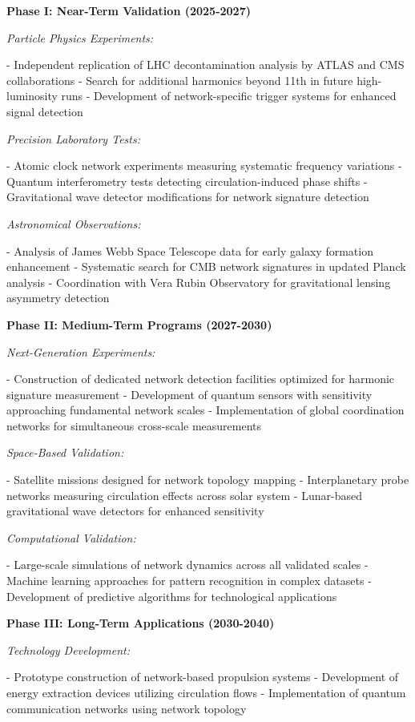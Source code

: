 \documentclass[11pt,a4paper]{article}
\begin{document}
\textbf{Phase I: Near-Term Validation (2025-2027)}

\textit{Particle Physics Experiments:}

- Independent replication of LHC decontamination analysis by ATLAS and CMS collaborations
- Search for additional harmonics beyond 11th in future high-luminosity runs
- Development of network-specific trigger systems for enhanced signal detection

\textit{Precision Laboratory Tests:}

- Atomic clock network experiments measuring systematic frequency variations
- Quantum interferometry tests detecting circulation-induced phase shifts
- Gravitational wave detector modifications for network signature detection

\textit{Astronomical Observations:}

- Analysis of James Webb Space Telescope data for early galaxy formation enhancement
- Systematic search for CMB network signatures in updated Planck analysis
- Coordination with Vera Rubin Observatory for gravitational lensing asymmetry detection

\textbf{Phase II: Medium-Term Programs (2027-2030)}

\textit{Next-Generation Experiments:}

- Construction of dedicated network detection facilities optimized for harmonic signature measurement
- Development of quantum sensors with sensitivity approaching fundamental network scales
- Implementation of global coordination networks for simultaneous cross-scale measurements

\textit{Space-Based Validation:}

- Satellite missions designed for network topology mapping
- Interplanetary probe networks measuring circulation effects across solar system
- Lunar-based gravitational wave detectors for enhanced sensitivity

\textit{Computational Validation:}

- Large-scale simulations of network dynamics across all validated scales
- Machine learning approaches for pattern recognition in complex datasets
- Development of predictive algorithms for technological applications

\textbf{Phase III: Long-Term Applications (2030-2040)}

\textit{Technology Development:}

- Prototype construction of network-based propulsion systems
- Development of energy extraction devices utilizing circulation flows
- Implementation of quantum communication networks using network topology
\end{document}

